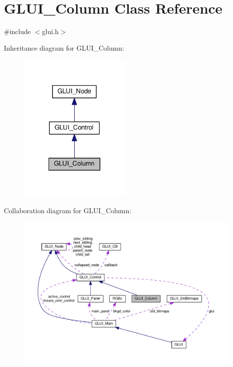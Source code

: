 \hypertarget{class_g_l_u_i___column}{\section{G\+L\+U\+I\+\_\+\+Column Class Reference}
\label{class_g_l_u_i___column}
}


{\ttfamily \#include $<$glui.\+h$>$}



Inheritance diagram for G\+L\+U\+I\+\_\+\+Column\+:\nopagebreak
\begin{figure}[H]
\begin{center}
\leavevmode
\includegraphics[width=158pt]{class_g_l_u_i___column__inherit__graph}
\end{center}
\end{figure}


Collaboration diagram for G\+L\+U\+I\+\_\+\+Column\+:\nopagebreak
\begin{figure}[H]
\begin{center}
\leavevmode
\includegraphics[width=350pt]{class_g_l_u_i___column__coll__graph}
\end{center}
\end{figure}
